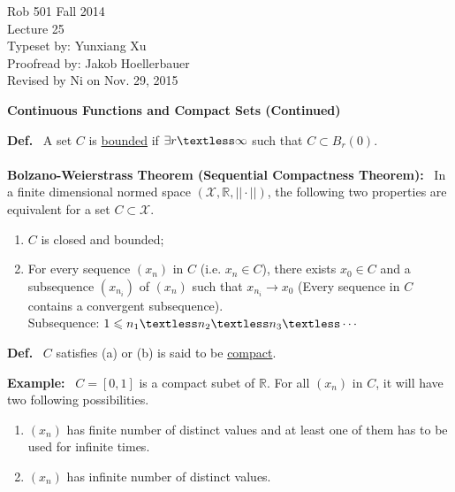 \documentclass[letterpaper]{article}
\newcommand{\real}{\mathbb R}  %
\begin{document}
\baselineskip=48pt  %

\setlength{\parskip}{.3in}
\setlength{\itemsep}{.3in}

\pagestyle{plain}

{\Large \bf
\begin{center}
Rob 501 Fall 2014\\
Lecture 25\\
Typeset by:  Yunxiang Xu\\
Proofread by: Jakob Hoellerbauer\\
Revised by Ni on Nov. 29, 2015
\end{center}
}

\Large

\begin{center}\textbf{Continuous Functions and Compact Sets (Continued)}\end{center}

\noindent \textbf{Def.}~ A set $C$ is \underline{bounded} if $\exists r \textless \infty$ such that $C \subset B_r(0)$.\\\\
\noindent \textbf{Bolzano-Weierstrass Theorem (Sequential Compactness Theorem):}~ In a finite dimensional normed space $(\mathcal{X},\real,||\cdot||)$,
the following two properties are equivalent for a set $C \subset \mathcal{X}$.
\renewcommand{\labelenumi}{(\alph{enumi})}
\begin{enumerate}
\item
$C$ is closed and bounded;
\item
For every sequence $(x_n)$ in $C$ (i.e. $x_n \in C$), there exists $x_0 \in C$ and a subsequence
$(x_{n_i})$ of $(x_n)$ such that $x_{n_i} \to x_0$ (Every sequence in $C$ contains a convergent subsequence).\\
Subsequence: $1\leqslant n_1 \textless n_2 \textless n_3 \textless \dotsb$
\end{enumerate}

\noindent \textbf{Def.}~ $C$ satisfies (a) or (b) is said to be \underline{compact}.


\noindent \textbf{Example:}~ $C=[0,1]$ is a compact subet of $\real$. For all $(x_n)$ in $C$, it will have two following possibilities.
\renewcommand{\labelenumi}{(\alph{enumi})}
\begin{enumerate}
\item
$(x_n)$ has finite number of distinct values and at least one of them has to be used for infinite times.
\item
$(x_n)$ has infinite number of distinct values.
\end{enumerate}
\end{document}
